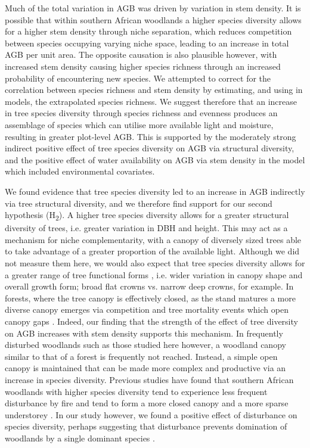 \documentclass[11pt,a4paper]{article}
\begin{document}
Much of the total variation in AGB was driven by variation in stem density. It is possible that within southern African woodlands a higher species diversity allows for a higher stem density through niche separation, which reduces competition between species occupying varying niche space, leading to an increase in total AGB per unit area. The opposite causation is also plausible however, with increased stem density causing higher species richness through an increased probability of encountering new species. We attempted to correct for the correlation between species richness and stem density by estimating, and using in models, the extrapolated species richness. We suggest therefore that an increase in tree species diversity through species richness and evenness produces an assemblage of species which can utilise more available light and moisture, resulting in greater plot-level AGB. This is supported by the moderately strong indirect positive effect of tree species diversity on AGB via structural diversity, and the positive effect of water availability on AGB via stem density in the model which included environmental covariates. 

We found evidence that tree species diversity led to an increase in AGB indirectly via tree structural diversity, and we therefore find support for our second hypothesis (H\textsubscript{2}). A higher tree species diversity allows for a greater structural diversity of trees, i.e. greater variation in DBH and height. This may act as a mechanism for niche complementarity, with a canopy of diversely sized trees able to take advantage of a greater proportion of the available light. Although we did not measure them here, we would also expect that tree species diversity allows for a greater range of tree functional forms \citep{}, i.e. wider variation in canopy shape and overall growth form; broad flat crowns vs. narrow deep crowns, for example. In forests, where the tree canopy is effectively closed, as the stand matures a more diverse canopy emerges via competition and tree mortality events which open canopy gaps \citep{Muscolo2014}. Indeed, our finding that the strength of the effect of tree diversity on AGB increases with stem density supports this mechanism. In frequently disturbed woodlands such as those studied here however, a woodland canopy similar to that of a forest is frequently not reached. Instead, a simple open canopy is maintained that can be made more complex and productive via an increase in species diversity. Previous studies have found that southern African woodlands with higher species diversity tend to experience less frequent disturbance by fire and tend to form a more closed canopy and a more sparse understorey \citep{Chidumayo2013, Mutowo2012}. In our study however, we found a positive effect of disturbance on species diversity, perhaps suggesting that disturbance prevents domination of woodlands by a single dominant species \citep{Chidumayo2013}.
\end{document}
